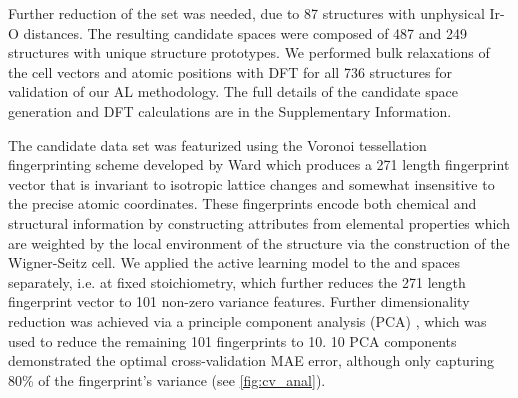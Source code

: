 %
Further reduction of the set was needed, due to 87 structures with unphysical Ir-O distances.
%
%
%
The resulting candidate spaces were composed of \num{487} \IrOtwo and \num{249} \IrOthree structures with unique structure prototypes.
%
We performed bulk relaxations of the cell vectors and atomic positions with DFT for all \num{736} structures for validation of our AL methodology.
%
The full details of the candidate space generation and DFT calculations are in the Supplementary Information.
%
%


%
The candidate data set was featurized using the Voronoi tessellation fingerprinting scheme developed by Ward  \cite{Ward2017} which produces a \num{271} length fingerprint vector that is invariant to isotropic lattice changes and somewhat insensitive to the precise atomic coordinates.
%
These fingerprints encode both chemical and structural information by constructing attributes from elemental properties which are weighted by the local environment of the structure via the construction of the Wigner-Seitz cell.
\cite{Wigner1933}
%
We applied the active learning model to the \IrOtwo and \IrOthree spaces separately, i.e. at fixed stoichiometry, which further reduces the \num{271} length fingerprint vector to \num{101} non-zero variance features.
%
Further dimensionality reduction was achieved via a principle component analysis (PCA) \cite{Tipping1999}, which was used to reduce the remaining \num{101} fingerprints to \num{10}.
%
\num{10} PCA components demonstrated the optimal cross-validation MAE error, although only capturing 80\% of the fingerprint's variance (see \ref{fig:cv_anal}).


